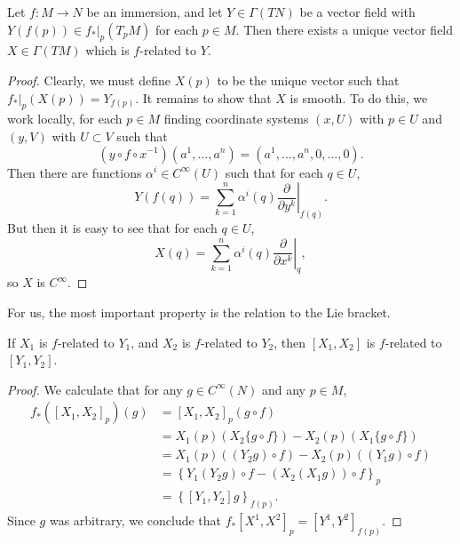 \begin{lemma}
    Let $f: M \to N$ be an immersion, and let $Y \in \Gamma(TN)$ be a vector field with $Y(f(p)) \in f_*|_p(T_pM)$ for each $p \in M$. Then there exists a unique vector field $X \in \Gamma(TM)$ which is $f$-related to $Y$.
\end{lemma}
\begin{proof}
    Clearly, we must define $X(p)$ to be the unique vector such that $f_*|_p(X(p)) = Y_{f(p)}$. It remains to show that $X$ is smooth. To do this, we work locally, for each $p \in M$ finding coordinate systems $(x,U)$ with $p \in U$ and $(y,V)$ with $U \subset V$ such that
    \[ (y \circ f \circ x^{-1})(a^1,\dots,a^n) = (a^1,\dots,a^n,0,\dots,0). \]
    Then there are functions $\alpha^i \in C^\infty(U)$ such that for each $q \in U$,
    \[ Y(f(q)) = \sum_{k = 1}^n \alpha^i(q) \left. \frac{\partial}{\partial y^k} \right|_{f(q)}. \]
    But then it is easy to see that for each $q \in U$,
    \[ X(q) = \sum_{k = 1}^n \alpha^i(q) \left. \frac{\partial}{\partial x^k} \right|_q, \]
    so $X$ is $C^\infty$.
\end{proof}

For us, the most important property is the relation to the Lie bracket.

\begin{theorem}
    If $X_1$ is $f$-related to $Y_1$, and $X_2$ is $f$-related to $Y_2$, then $[X_1,X_2]$ is $f$-related to $[Y_1,Y_2]$.
\end{theorem}
\begin{proof}
    We calculate that for any $g \in C^\infty(N)$ and any $p \in M$,
    \begin{align*}
        f_*([X_1,X_2]_p)(g) &= [X_1,X_2]_p(g \circ f)\\
        &= X_1(p) (X_2 \{ g \circ f \}) - X_2(p) (X_1 \{ g \circ f \} )\\
        &= X_1(p) ((Y_2 g) \circ f) - X_2(p) ((Y_1 g) \circ f)\\
        &= \left\{ Y_1(Y_2 g) \circ f - (X_2(X_1 g)) \circ f \right\}_p\\
        &= \left\{ [Y_1,Y_2] g \right\}_{f(p)}.
    \end{align*}
    Since $g$ was arbitrary, we conclude that $f_*[X^1,X^2]_p = [Y^1,Y^2]_{f(p)}$.
\end{proof}

